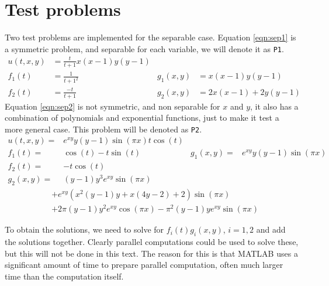 \section{Test problems} \label{sec:test}
Two test problems are implemented for the separable case. Equation \eqref{eqn:sep1} is a symmetric problem, and separable for each variable, we will denote it as \texttt{P1}. 
\begin{equation} \label{eqn:sep1}
\begin{aligned}
 u(t,x,y)&= \frac{t}{t+1} x(x-1)y(y-1) \\
 f_1(t)&=\frac{1}{t+1^2} & g_1(x,y)&= x(x-1)y(y-1) \\
 f_2(t) &= \frac{-t}{t+1} & g_2(x,y)& = 2x(x-1) +2y(y-1)
 \end{aligned}
\end{equation}
Equation \eqref{eqn:sep2} is not symmetric, and non separable for $x$ and $y$, it also has a combination of polynomials and exponential functions, just to make it test a more general case. 
This problem will be denoted as \texttt{P2}.\\
\begin{equation} \label{eqn:sep2}
\begin{aligned}
 u(t,x,y)=& e^{xy}y(y-1) \sin( \pi x)t \cos(t)& \\
 f_1(t) =& \cos(t)-t \sin(t)  & g_1(x,y) =&e^{xy}y(y-1) \sin( \pi x)\\
 f_2(t) =& -t \cos(t) \\ g_2(x,y) =&(y-1)y^3e^{xy} \sin ( \pi x)
 \end{aligned}
\end{equation}
\begin{equation*}
\begin{aligned}
&+e^{xy}(x^2(y-1)y+x(4y-2)+2) \sin( \pi x) \\&+2 \pi (y-1) y^2 e^{xy} \cos( \pi x)- \pi^2 (y-1)y e^{xy} \sin( \pi x )
 \end{aligned}
\end{equation*}

To obtain the solutions, we need to solve for $f_i(t) g_i(x,y)$, $i = 1,2 $ and add the solutions together. Clearly parallel computations could be used to solve these, but this will not be done in this text. The reason for this is that MATLAB uses a significant amount of time to prepare parallel computation, often much larger time than the computation itself.\\

